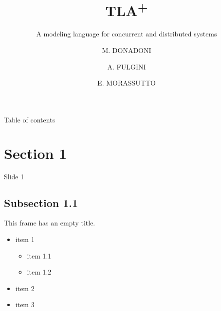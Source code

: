 \documentclass{beamer}
\title{TLA\texorpdfstring{\textsuperscript{+}}{+}}
\subtitle{%
    A modeling language for
    \texorpdfstring{\linebreak}{}%
    concurrent and distributed systems
}
\author{M. DONADONI \and A. FULGINI \and E. MORASSUTTO}
\begin{document}
    \begin{frame}
        \maketitle
    \end{frame}

    \begin{frame}{Table of contents}
      \tableofcontents
    \end{frame}

    \section[image=bgphoto_cut]{Section 1}
    \begin{frame}[plain]{}
        \sectionpage
    \end{frame}

    \begin{frame}{Slide 1}
        \lipsum[1]
    \end{frame}

    \subsection{Subsection 1.1}
    \begin{frame}[plain]{}
        \subsectionpage
    \end{frame}
    \begin{frame}
        This frame has an empty title.
        \vfill
        \begin{itemize}
            \item item 1
            \begin{itemize}
                \item item 1.1
                \item item 1.2
            \end{itemize}
            \item item 2
            \item item 3
        \end{itemize}
    \end{frame}
\end{document}
